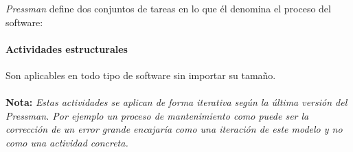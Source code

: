 

\textit{Pressman} define dos conjuntos de tareas en lo que él denomina el proceso del software:

\paragraph{Actividades estructurales} Son aplicables en todo tipo de software sin importar su tamaño.\\\\
\textbf{Nota:} \textit{Estas actividades se aplican de forma iterativa según la última versión del Pressman. Por ejemplo un proceso de mantenimiento como puede ser la corrección de un error grande encajaría como una iteración de este modelo y no como una actividad concreta.}

